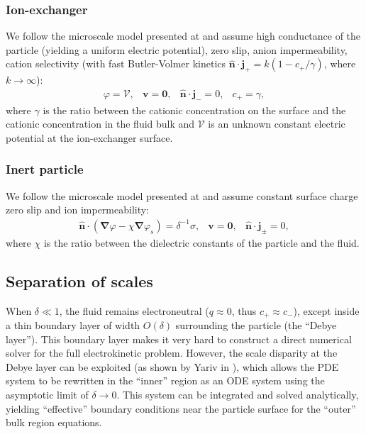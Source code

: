 \documentclass[MSc,beforeExam]{iitcsthesis}
\newcommand\bnabla{\boldsymbol{\nabla}}
\newcommand\bv{\boldsymbol{v}}
\newcommand\bn{\boldsymbol{\hat{n}}}
\newcommand\bj{\boldsymbol{j}}
\newcommand\bzero{\boldsymbol{0}}
\newcommand\cV{\mathscr{V}}
\begin{document}
\subsubsection{Ion-exchanger}
We follow the microscale model presented at \cite{yariv2010migration}
and assume high conductance of the particle (yielding a uniform electric potential),
zero slip, anion impermeability, cation selectivity 
(with fast Butler-Volmer\cite{bard2000book} kinetics
$\bn \cdot \bj_+ = k (1 - c_+/\gamma)$, where $k \rightarrow \infty$):
\begin{equation}
\begin{array}{cccc}
\varphi = \cV, &
\bv = \bzero, &
\bn \cdot \bj_- = 0, &
c_+ = \gamma,
\end{array}
\end{equation}
where $\gamma$ is the ratio between the cationic concentration on the surface and the cationic
concentration in the fluid bulk and $\cV$ is an unknown constant electric potential at
the ion-exchanger surface. 

\subsubsection{Inert particle}
We follow the microscale model presented at \cite{schnitzer2012surface}
and assume constant surface charge
zero slip and ion impermeability:
\begin{equation}
\begin{array}{cccc}
\bn \cdot (\bnabla \varphi - \chi \bnabla \varphi_s) = \delta^{-1} \sigma, &
\bv = \bzero, &
\bn \cdot \bj_\pm = 0,
\end{array}
\end{equation}
where $\chi$ is the ratio between the dielectric constants of the 
particle and the fluid.

\subsection{Separation of scales}
When $\delta \ll 1$, 
the fluid remains electroneutral ($q \approx 0$, thus $c_+ \approx c_-$), 
except inside a thin boundary layer of width $O(\delta)$ 
surrounding the particle (the ``Debye layer'').
This boundary layer makes it very hard to construct 
a direct numerical solver for the full electrokinetic problem.
However, the scale disparity at the Debye layer can be exploited
(as shown by Yariv in \cite{yariv2010asymptotic}), 
which allows the PDE system to be rewritten in the ``inner'' region 
as an ODE system using the asymptotic limit of $\delta \rightarrow 0$.
This system can be integrated and solved analytically,
yielding ``effective'' boundary conditions near
the particle surface for the ``outer'' bulk region equations.
\end{document}
